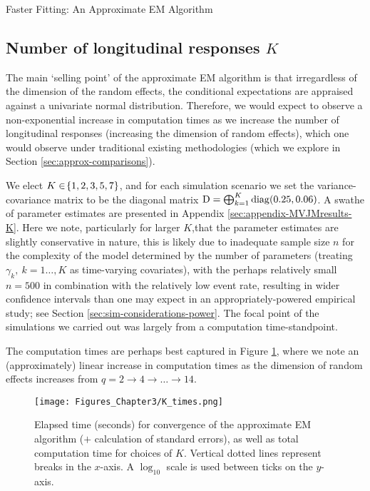 \begin{chapter}{\label{cha:approx}Faster Fitting: An Approximate EM Algorithm}
  \subsection{Number of longitudinal responses \texorpdfstring{$K$}{K}}\label{sec:approx-sims-K}
  The main `selling point' of the approximate EM algorithm is that irregardless of the dimension of the random effects, the conditional expectations are appraised against a univariate normal distribution. Therefore, we would expect to observe a non-exponential increase in computation times as we increase the number of longitudinal responses (\ie increasing the dimension of random effects), which one would observe under traditional existing methodologies (which we explore in Section \ref{sec:approx-comparisons}). 

  We elect $K\in\!\left\{1,2,3,5,7\right\}$, and for each simulation scenario we set the variance-covariance matrix to be the diagonal matrix $\mathrm{D}=\bigoplus_{k=1}^K \mathrm{diag}\!\left(0.25, 0.06\right)$. A swathe of parameter estimates are presented in Appendix \ref{sec:appendix-MVJMresults-K}. Here we note, particularly for larger $K$,that the parameter estimates are slightly conservative in nature, this is likely due to inadequate sample size $n$ for the complexity of the model determined by the number of parameters (\ie treating $\gamma_k,\ k=1\dots,K$ as time-varying covariates), with the perhaps relatively small $n=500$ in combination with the relatively low event rate, resulting in wider confidence intervals than one may expect in an appropriately-powered empirical study; see Section \ref{sec:sim-considerations-power}. The focal point of the simulations we carried out was largely from a computation time-standpoint.
  
  The computation times are perhaps best captured in Figure \ref{fig:approx-sims-K}, where we note an (approximately) linear increase in computation times as the dimension of random effects increases from $q=2\rightarrow4\rightarrow\dots\rightarrow14$.

  \begin{figure}[t]
      \centering
      \texttt{[image: Figures\_Chapter3/K\_times.png]}
      \caption{Elapsed time (seconds) for convergence of the approximate EM algorithm ($+$ calculation of standard errors), as well as total computation time for choices of $K$. Vertical dotted lines represent breaks in the $x$-axis. A $\log_{10}$ scale is used between ticks on the $y$-axis.}
      \label{fig:approx-sims-K}
  \end{figure}
  

\end{chapter}
